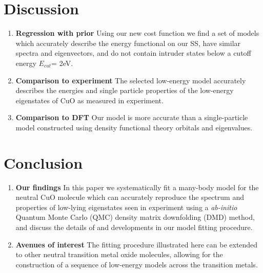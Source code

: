 \documentclass{article}
\begin{document}
\section{Discussion}
\begin{enumerate}
\item \textbf{Regression with prior} Using our new cost function we find a set of models which accurately describe the energy functional on our SS, have similar spectra and eigenvectors, and do not contain  intruder states below a cutoff energy $E_{cut} $= 2eV.

\item \textbf{Comparison to experiment} The selected low-energy model accurately describes the energies and single particle properties of the low-energy eigenstates of CuO as measured in experiment.

\item \textbf{Comparison to DFT} Our model is more accurate than a single-particle model constructed using density functional theory orbitals and eigenvalues.
\end{enumerate}

\section{Conclusion}
\begin{enumerate}
\item \textbf{Our findings} In this paper we systematically fit a many-body model for the neutral CuO molecule which can accurately reproduce the spectrum and properties of low-lying eigenstates seen in experiment using a \textit{ab-initio} Quantum Monte Carlo (QMC) density matrix downfolding (DMD) method, and discuss the details of and developments in our model fitting procedure.

\item \textbf{Avenues of interest} The fitting procedure illustrated here can be extended to other neutral transition metal oxide molecules, allowing for the construction of a sequence of low-energy models across the transition metals.
\end{enumerate}

\pagebreak
\end{document}
